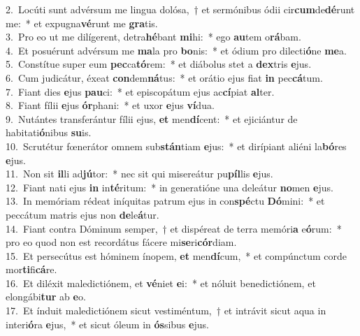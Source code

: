 {2.~}Locúti sunt advérsum me lingua dolósa,~† et sermónibus ódii cir\textbf{cum}de\textbf{dé}runt me:~* et expugna\textbf{vé}runt me \textbf{gra}tis.\\
{3.~}Pro eo ut me dilígerent, detra\textbf{hé}bant \textbf{mi}hi:~* ego \textbf{au}tem o\textbf{rá}bam.\\
{4.~}Et posuérunt advérsum me \textbf{ma}la pro \textbf{bo}nis:~* et ódium pro dilecti\textbf{ó}ne \textbf{me}a.\\
{5.~}Constítue super eum \textbf{pec}ca\textbf{tó}rem:~* et diábolus stet a \textbf{dex}tris \textbf{e}jus.\\
{6.~}Cum judicátur, éxeat \textbf{con}dem\textbf{ná}tus:~* et orátio ejus fiat \textbf{in} pec\textbf{cá}tum.\\
{7.~}Fiant dies \textbf{e}jus \textbf{pau}ci:~* et episcopátum ejus ac\textbf{cí}piat \textbf{al}ter.\\
{8.~}Fiant fílii \textbf{e}jus \textbf{ór}phani:~* et uxor \textbf{e}jus \textbf{ví}dua.\\
{9.~}Nutántes transferántur fílii ejus, \textbf{et} men\textbf{dí}cent:~* et ejiciántur de habitati\textbf{ó}nibus \textbf{su}is.\\
{10.~}Scrutétur fœnerátor omnem sub\textbf{stán}tiam \textbf{e}jus:~* et dirípiant aliéni la\textbf{bó}res \textbf{e}jus.\\
{11.~}Non sit \textbf{il}li ad\textbf{jú}tor:~* nec sit qui misereátur pu\textbf{píl}lis \textbf{e}jus.\\
{12.~}Fiant nati ejus \textbf{in} in\textbf{té}ritum:~* in generatióne una deleátur \textbf{no}men \textbf{e}jus.\\
{13.~}In memóriam rédeat iníquitas patrum ejus in con\textbf{spé}ctu \textbf{Dó}mini:~* et peccátum matris ejus non \textbf{de}le\textbf{á}tur.\\
{14.~}Fiant contra Dóminum semper,~† et dispéreat de terra memóri\textbf{a} e\textbf{ó}rum:~* pro eo quod non est recordátus fácere mi\textbf{se}ri\textbf{cór}diam.\\
{15.~}Et persecútus est hóminem ínopem, \textbf{et} men\textbf{dí}cum,~* et compúnctum corde mor\textbf{ti}fi\textbf{cá}re.\\
{16.~}Et diléxit maledictiónem, et \textbf{vé}niet \textbf{e}i:~* et nóluit benedictiónem, et elongábi\textbf{tur} ab \textbf{e}o.\\
{17.~}Et índuit maledictiónem sicut vestiméntum,~† et intrávit sicut aqua in interi\textbf{ó}ra \textbf{e}jus,~* et sicut óleum in \textbf{ós}sibus \textbf{e}jus.\\
